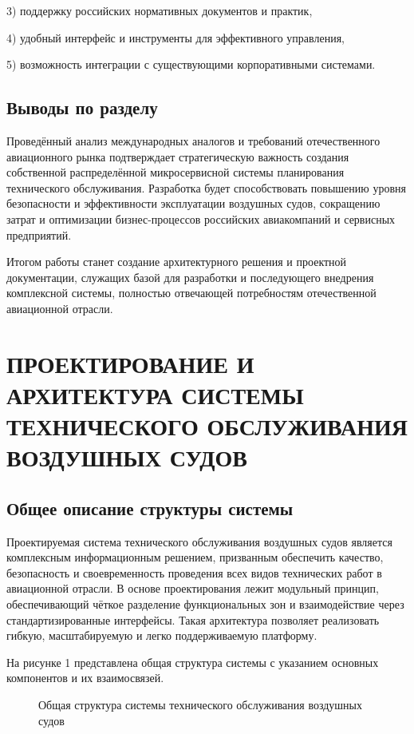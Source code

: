 \documentclass[14pt,a4paper]{extarticle}
\begin{document}
3) поддержку российских нормативных документов и практик,

4) удобный интерфейс и инструменты для эффективного управления,

5) возможность интеграции с существующими корпоративными системами.

\subsection{Выводы по разделу}

Проведённый анализ международных аналогов и требований отечественного авиационного рынка подтверждает стратегическую важность создания собственной распределённой микросервисной системы планирования технического обслуживания. Разработка будет способствовать повышению уровня безопасности и эффективности эксплуатации воздушных судов, сокращению затрат и оптимизации бизнес-процессов российских авиакомпаний и сервисных предприятий.

Итогом работы станет создание архитектурного решения и проектной документации, служащих базой для разработки и последующего внедрения комплексной системы, полностью отвечающей потребностям отечественной авиационной отрасли.

\newpage


\section{ПРОЕКТИРОВАНИЕ И АРХИТЕКТУРА СИСТЕМЫ ТЕХНИЧЕСКОГО ОБСЛУЖИВАНИЯ ВОЗДУШНЫХ СУДОВ}

\subsection{Общее описание структуры системы}

Проектируемая система технического обслуживания воздушных судов является комплексным информационным решением, призванным обеспечить качество, безопасность и своевременность проведения всех видов технических работ в авиационной отрасли. В основе проектирования лежит модульный принцип, обеспечивающий чёткое разделение функциональных зон и взаимодействие через стандартизированные интерфейсы. Такая архитектура позволяет реализовать гибкую, масштабируемую и легко поддерживаемую платформу.

На рисунке 1 представлена общая структура системы с указанием основных компонентов и их взаимосвязей.

\begin{figure}[h]
\centering
\caption{Общая структура системы технического обслуживания воздушных судов}
\end{figure}
\end{document}
